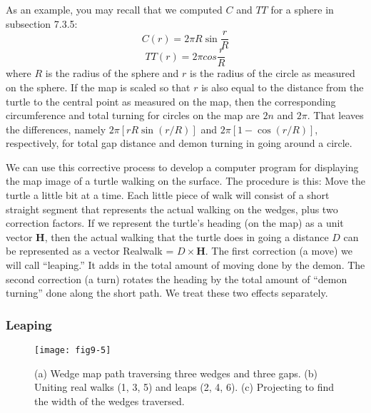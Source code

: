\documentclass{book}
\begin{document}
As an example, you may recall that we computed $C$ and $TT$ for a
sphere in subsection 7.3.5:
$$C(r) = 2 \pi R \sin \frac {r} {R}$$
$$TT(r) = 2 \pi cos\frac {r} {R}$$
where $R$ is the radius of the sphere and $r$ is the radius of the circle as
measured on the sphere. If the map is scaled so that $r$ is also equal
to the distance from the turtle to the central point as measured on the
map, then the corresponding circumference and total turning for circles
on the map are $2n$ and $2 \pi$. That leaves the differences, namely $2 \pi [ r R \sin (r / R)]$ and $2 \pi [1 - \cos (r / R)]$, respectively, for total gap distance
and demon turning in going around a circle.

We can use this corrective process to develop a computer program
for displaying the map image of a turtle walking on the surface. The
procedure is this: Move the turtle a little bit at a time. Each little
piece of walk will consist of a short straight segment that represents
the actual walking on the wedges, plus two correction factors. If we
represent the turtle's heading (on the map) as a unit vector \textbf{H}, then
the actual walking that the turtle does in going a distance $D$ can be
represented as a vector Realwalk = $D \times \mathbf{H}$. The first correction (a
move) we will call ``leaping.'' It adds in the total amount of moving
done by the demon. The second correction (a turn) rotates the heading
by the total amount of ``demon turning'' done along the short path. We
treat these two effects separately.

\subsubsection{Leaping}

\begin{figure}
\begin{center}
\texttt{[image: fig9-5]}
\caption{(a) Wedge map path traversing three wedges and three gaps. (b) Uniting real walks (1, 3, 5) and leaps (2, 4, 6). (c) Projecting to find the width of the wedges traversed.}
\end{center}
\end{figure}
\end{document}
